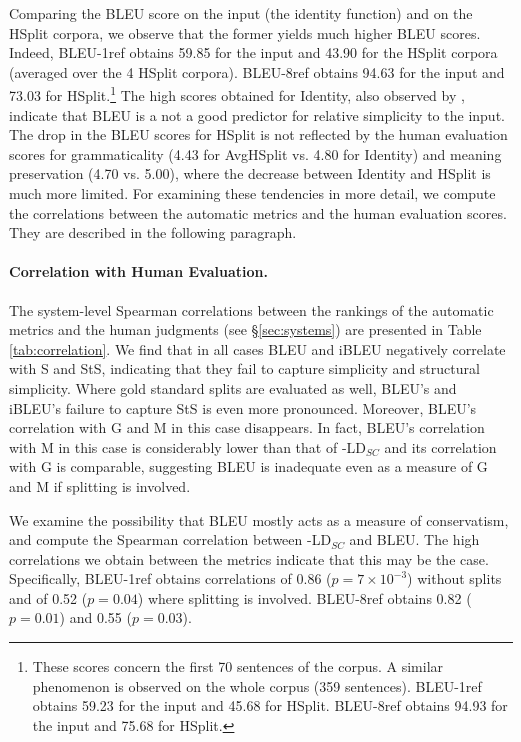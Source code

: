 \documentclass[11pt,a4paper]{article}
\begin{document}
Comparing the BLEU score on the input (the identity function) and on the HSplit corpora, we observe that the former yields much higher BLEU scores. Indeed, BLEU-1ref obtains 59.85 for the input and 43.90 for the HSplit corpora (averaged over the 4 HSplit corpora). BLEU-8ref obtains 94.63 for the input and 73.03 for HSplit.\footnote{These scores concern the first 70 sentences of the corpus. A similar phenomenon is observed on the whole corpus (359 sentences). BLEU-1ref obtains 59.23 for the input and 45.68
for HSplit. BLEU-8ref obtains 94.93 for the input and 75.68 for HSplit.} The high scores obtained for Identity, also observed by \citet{Xu16}, indicate that BLEU is a not a good predictor for relative simplicity to the input. The drop in the BLEU scores for HSplit is not reflected by the human evaluation scores for grammaticality (4.43 for AvgHSplit vs. 4.80 for Identity) and meaning preservation (4.70 vs. 5.00), where the decrease between Identity and HSplit is much more limited. For examining these tendencies in more detail, we compute the correlations between the automatic metrics and the human evaluation scores. They are described in the following paragraph.
  
\paragraph{Correlation with Human Evaluation.}
The system-level Spearman correlations between the rankings of the automatic metrics and the human judgments
(see \S\ref{sec:systems}) are presented in Table \ref{tab:correlation}.
We find that in all cases BLEU and iBLEU negatively correlate with S and StS, indicating that they fail to capture simplicity and structural simplicity.
Where gold standard splits are evaluated as well, 
BLEU's and iBLEU's failure to capture StS is even more pronounced.
Moreover, BLEU's correlation with G and M in this case disappears. In fact,
BLEU's correlation with M in this case
is considerably lower than that of -LD$_{SC}$ and its correlation with G is comparable, suggesting BLEU is 
inadequate even as a measure of G and M if splitting is involved.

We examine the possibility that BLEU mostly acts as a measure of conservatism,
and compute the Spearman correlation between -LD$_{SC}$ and BLEU.
The high correlations we obtain between the metrics indicate that this may be the case.
Specifically, BLEU-1ref obtains correlations of 0.86 ($p= 7 \times 10^{-3}$) without splits and of 0.52 ($p=0.04$) where splitting is involved.
BLEU-8ref obtains %
0.82 ($p=0.01$) and 0.55 ($p=0.03$).
\end{document}
